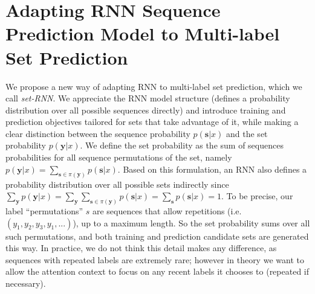 
\section{Adapting RNN Sequence Prediction Model to Multi-label Set Prediction}
\label{sec:Model}

We propose a new way of adapting RNN to multi-label set prediction, which we call \emph{set-RNN}. We appreciate the RNN model structure \cite{rumelhart1988learning} (defines a probability distribution over all possible sequences directly) and introduce training and prediction objectives tailored for sets that take advantage of it, while making a clear distinction between the sequence probability $p(\mathbf{s}|x)$ and the set probability $p(\mathbf{y}|x)$. 
  We define the set probability as the sum of sequences probabilities for all sequence permutations of the set, namely $p(\mathbf{y}|x)=\sum_{\mathbf{s}\in \pi(\mathbf{y})} p(\mathbf{s}|x)$. Based on this formulation, an RNN also defines a probability distribution over all possible sets indirectly since $\sum_{\mathbf{y}} p(\mathbf{y}|x)=\sum_{\mathbf{y}}\sum_{\mathbf{s}\in \pi(\mathbf{y})} p(\mathbf{s}|x)=\sum_{\mathbf{s}} p(\mathbf{s}|x)=1$.   
  To be precise, our label ``permutations'' $s$ are sequences that allow repetitions (i.e.\ $(y_1,y_2,y_3,y_1,...)$), up to a maximum length. So the set probability sums over all such permutations, and both training and prediction candidate sets are generated this way. In practice, we do not think this detail makes any difference, as sequences with repeated labels are extremely rare; however in theory we want to allow the attention context to focus on any recent labels it chooses to (repeated if necessary).
  
